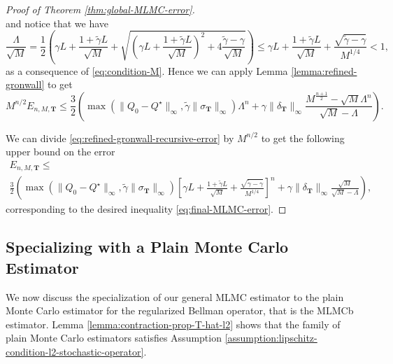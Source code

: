 \documentclass[11pt]{article}
\numberwithin{equation}{section}
\theoremstyle{definition}
\theoremstyle{remark}
\begin{document}
\begin{proof}[Proof of Theorem \ref{thm:global-MLMC-error}]
\[    \]
    and notice that we have
    \begin{equation}
    \label{eq:bound-lambda}
    \frac{\Lambda}{\sqrt{M}} = \frac{1}{2} \left(\gamma L + \frac{1 + \tilde{\gamma}L}{\sqrt{M}} + \sqrt{\left(\gamma L + \frac{1 + \tilde{\gamma}L}{\sqrt{M}}\right)^2 + 4\frac{\tilde{\gamma} - \gamma}{\sqrt{M}}}\right) \leq
    \gamma L + \frac{1 + \tilde{\gamma} L}{\sqrt{M}} + \frac{\sqrt{\tilde{\gamma} - \gamma}}{M^{1/4}} < 1,
    \end{equation}
    as a consequence of \eqref{eq:condition-M}.
    Hence we can apply Lemma \ref{lemma:refined-gronwall} to get
    \begin{equation}
    \label{eq:refined-gronwall-recursive-error}
        M^{n/2} E_{n,M,\mathbf T} \leq 
        \frac{3}{2} \left(\max\left( \| Q_0 - Q^\star\|_{\infty},  \tilde{\gamma} \| \sigma_{\mathbf T} \|_{\infty}\right) \Lambda^n + \gamma\| \delta_{\mathbf T} \|_{\infty} \frac{ M^{\frac{n+1}{2}} - \sqrt{M}\Lambda^n}{\sqrt{M} - \Lambda} \right). 
    \end{equation}
    
   We can divide \eqref{eq:refined-gronwall-recursive-error} by $M^{n/2}$ to get the following upper bound on the error
    \begin{multline}
        E_{n,M,\mathbf T} \leq \\ 
             \frac{3}{2}\left(\max\left( \| Q_0 - Q^\star\|_{\infty},  \tilde{\gamma} \| \sigma_{\mathbf T} \|_{\infty} \right) \left[\gamma L + \frac{1 + \tilde{\gamma} L}{\sqrt{M}} + \frac{\sqrt{\tilde{\gamma} - \gamma}}{M^{1/4}} \right]^n  + \gamma \|\delta_{\mathbf T} \|_{\infty}\frac{\sqrt{M} }{\sqrt{M} - \Lambda} \right),
    \end{multline}
    corresponding to the desired inequality \eqref{eq:final-MLMC-error}.
\end{proof}

\subsection{Specializing with a Plain Monte Carlo Estimator}
\label{subsection:specialising-error-plain-mc}

We now discuss the specialization of our general MLMC estimator to the plain Monte Carlo estimator for the regularized Bellman operator, that is the MLMCb estimator.
Lemma \ref{lemma:contraction-prop-T-hat-l2} shows that the family of plain Monte Carlo estimators satisfies Assumption \ref{assumption:lipschitz-condition-l2-stochastic-operator}.
 
\end{document}
